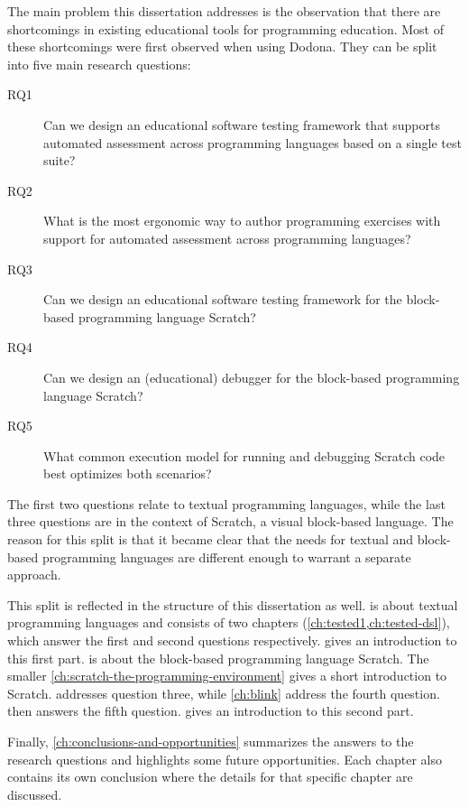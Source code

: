 \documentclass[../main]{subfiles}
\begin{document}
The main problem this dissertation addresses is the observation that there are shortcomings in existing educational tools for programming education.
Most of these shortcomings were first observed when using Dodona.
They can be split into five main research questions:

\begin{description}
    \item[RQ1] Can we design an educational software testing framework that supports automated assessment across programming languages based on a single test suite?
    \item[RQ2] What is the most ergonomic way to author programming exercises with support for automated assessment across programming languages?
    \item[RQ3] Can we design an educational software testing framework for the block-based programming language Scratch?
    \item[RQ4] Can we design an (educational) debugger for the block-based programming language Scratch?
    \item[RQ5] What common execution model for running and debugging Scratch code best optimizes both scenarios?
\end{description}

The first two questions relate to textual programming languages, while the last three questions are in the context of Scratch, a visual block-based language.
The reason for this split is that it became clear that the needs for textual and block-based programming languages are different enough to warrant a separate approach.

This split is reflected in the structure of this dissertation as well.
 is about textual programming languages and consists of two chapters (\cref{ch:tested1,ch:tested-dsl}), which answer the first and second questions respectively.
 gives an introduction to this first part.
 is about the block-based programming language Scratch.
The smaller \cref{ch:scratch-the-programming-environment} gives a short introduction to Scratch.
 addresses question three, while \cref{ch:blink} address the fourth question.
 then answers the fifth question.
 gives an introduction to this second part.

Finally, \cref{ch:conclusions-and-opportunities} summarizes the answers to the research questions and highlights some future opportunities.
Each chapter also contains its own conclusion where the details for that specific chapter are discussed.
\end{document}
